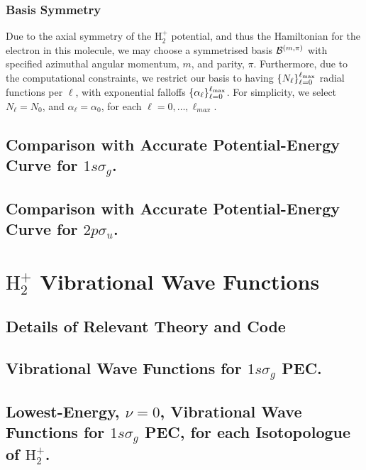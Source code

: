 \documentclass[draft]{article}
\begin{document}
\subsubsection*{Basis Symmetry}

Due to the axial symmetry of the $\mathrm{H}_{2}^{+}$ potential, and thus the
Hamiltonian for the electron in this molecule, we may choose a symmetrised
basis $\mathcal{B}^{(m, \pi)}$ with specified azimuthal angular momentum,
$m$, and parity, $\pi$.
Furthermore, due to the computational constraints, we restrict our basis to
having $\lbrace N_{\ell}\rbrace_{\ell = 0}^{\ell_{\max}}$ radial functions per $\ell$,
with exponential falloffs $\lbrace\alpha_{\ell}\rbrace_{\ell = 0}^{\ell_{\max}}$.
For simplicity, we select $N_{\ell} = N_{0}$, and $\alpha_{\ell} = \alpha_{0}$,
for each $\ell = 0, \dotsc, \ell_{max}$.

\subsection{Comparison with Accurate Potential-Energy Curve for $1s\sigma_{g}$.}

\subsection{Comparison with Accurate Potential-Energy Curve for $2p\sigma_{u}$.}

\section{$\mathrm{H}_{2}^{+}$ Vibrational Wave Functions}

\subsection*{Details of Relevant Theory and Code}

\subsection{Vibrational Wave Functions for $1s\sigma_{g}$ PEC.}

\subsection{Lowest-Energy, $\nu = 0$, Vibrational Wave Functions for
  $1s\sigma_{g}$ PEC, for each Isotopologue of $\mathrm{H}_{2}^{+}$.}
\end{document}
